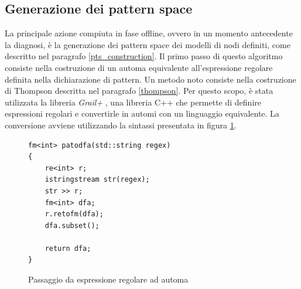 \subsection{Generazione dei pattern space}
La principale azione compiuta in fase offline, ovvero in un momento antecedente la diagnosi, è la generazione dei pattern space dei modelli di nodi definiti, come descritto nel paragrafo \ref{pts_construction}. 
Il primo passo di questo algoritmo consiste nella costruzione di un automa equivalente all'espressione regolare definita nella dichiarazione di pattern. Un metodo noto consiste nella costruzione di Thompson descritta nel paragrafo \ref{thompson}. 
Per questo scopo, è stata utilizzata la libreria \emph{Grail+} \cite{web:grail}, una libreria C++ che permette di definire espressioni regolari e convertirle in automi con un linguaggio equivalente.
La conversione avviene utilizzando la sintassi presentata in figura \ref{code:patodfa}.

\begin{figure}[htbp]
\begin{verbatim}
fm<int> patodfa(std::string regex)
{
    re<int> r;
    istringstream str(regex);
    str >> r;
    fm<int> dfa;
    r.retofm(dfa);
    dfa.subset();

    return dfa;
}
\end{verbatim}
\caption{Passaggio da espressione regolare ad automa}
\label{code:patodfa}
\end{figure}


